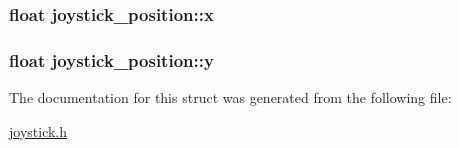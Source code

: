 \subsubsection[{\texorpdfstring{x}{x}}]{\setlength{\rightskip}{0pt plus 5cm}float joystick\+\_\+position\+::x}\hypertarget{structjoystick__position_a71c3292c1be3c3400a388eac41a47ad3}{}\label{structjoystick__position_a71c3292c1be3c3400a388eac41a47ad3}
\subsubsection[{\texorpdfstring{y}{y}}]{\setlength{\rightskip}{0pt plus 5cm}float joystick\+\_\+position\+::y}\hypertarget{structjoystick__position_ad8fc27fbd5404a4f8cdc1a045a0d689a}{}\label{structjoystick__position_ad8fc27fbd5404a4f8cdc1a045a0d689a}


The documentation for this struct was generated from the following file\+:\begin{DoxyCompactItemize}
\item 
\hyperlink{joystick_8h}{joystick.\+h}\end{DoxyCompactItemize}
